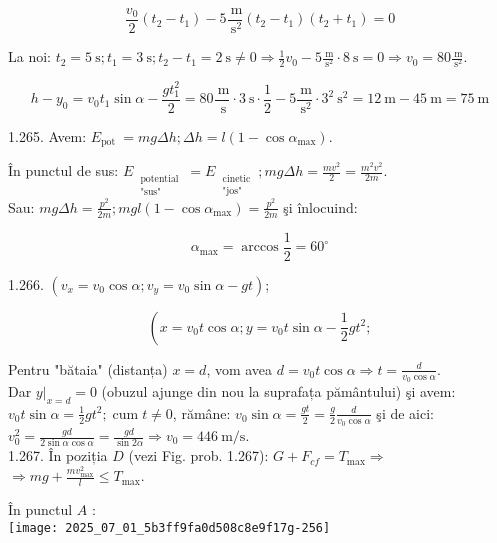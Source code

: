 $$
\frac{v_{0}}{2}\left(t_{2}-t_{1}\right)-5 \frac{\mathrm{~m}}{\mathrm{~s}^{2}}\left(t_{2}-t_{1}\right)\left(t_{2}+t_{1}\right)=0
$$

La noi: $t_{2}=5 \mathrm{~s} ; t_{1}=3 \mathrm{~s} ; t_{2}-t_{1}=2 \mathrm{~s} \neq 0 \Rightarrow \frac{1}{2} v_{0}-5 \frac{\mathrm{~m}}{\mathrm{~s}^{2}} \cdot 8 \mathrm{~s}=0 \Rightarrow v_{0}=80 \frac{\mathrm{~m}}{\mathrm{~s}^{2}}$.

$$
h-y_{0}=v_{0} t_{1} \sin \alpha-\frac{g t_{1}^{2}}{2}=80 \frac{\mathrm{~m}}{\mathrm{~s}} \cdot 3 \mathrm{~s} \cdot \frac{1}{2}-5 \frac{\mathrm{~m}}{\mathrm{~s}^{2}} \cdot 3^{2} \mathrm{~s}^{2}=12 \mathrm{~m}-45 \mathrm{~m}=75 \mathrm{~m}
$$

1.265. Avem: $E_{\text {pot }}=m g \Delta h ; \Delta h=l\left(1-\cos \alpha_{\max }\right)$.

În punctul de sus: $E_{\substack{\text { potential } \\ \text { "sus" }}}=E_{\substack{\text { cinetic } \\ \text { "jos" }}} ; m g \Delta h=\frac{m v^{2}}{2}=\frac{m^{2} v^{2}}{2 m}$.\\
Sau: $m g \Delta h=\frac{p^{2}}{2 m} ; m g l\left(1-\cos \alpha_{\max }\right)=\frac{p^{2}}{2 m}$ şi înlocuind:

$$
\alpha_{\max }=\arccos \frac{1}{2}=60^{\circ}
$$

1.266. $\left(v_{x}=v_{0} \cos \alpha ; v_{y}=v_{0} \sin \alpha-g t\right)$;

$$
\left(x=v_{0} t \cos \alpha ; y=v_{0} t \sin \alpha-\frac{1}{2} g t^{2} ;\right.
$$

Pentru "bătaia" (distanța) $x=d$, vom avea $d=v_{0} t \cos \alpha \Rightarrow t=\frac{d}{v_{0} \cos \alpha}$.\\
Dar $\left.y\right|_{x=d}=0$ (obuzul ajunge din nou la suprafața pământului) şi avem:\\
$v_{0} t \sin \alpha=\frac{1}{2} g t^{2} ; \operatorname{cum} t \neq 0$, rămâne: $v_{0} \sin \alpha=\frac{g t}{2}=\frac{g}{2} \frac{d}{v_{0} \cos \alpha}$ şi de aici:\\
$v_{0}^{2}=\frac{g d}{2 \sin \alpha \cos \alpha}=\frac{g d}{\sin 2 \alpha} \Rightarrow v_{0}=446 \mathrm{~m} / \mathrm{s}$.\\
1.267. În poziția $D$ (vezi Fig. prob. 1.267): $G+F_{c f}=T_{\max } \Rightarrow$ $\Rightarrow m g+\frac{m v_{\max }^{2}}{l} \leq T_{\max }$.

În punctul $A$ :\\
\texttt{[image: 2025\_07\_01\_5b3ff9fa0d508c8e9f17g-256]}

